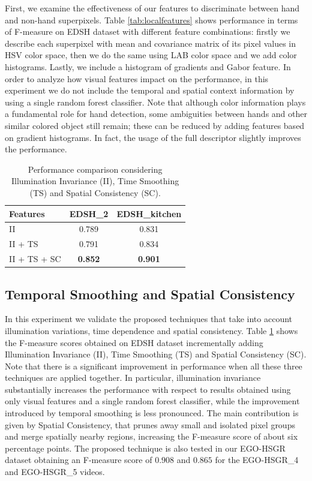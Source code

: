 First, we examine the effectiveness of our features to discriminate between hand and non-hand superpixels. 
Table \ref{tab:localfeatures} shows performance in terms of F-measure on EDSH dataset with different feature combinations: firstly we describe each superpixel with mean and covariance matrix of its pixel values in HSV color space, then we do the same using LAB color space and we add color histograms. Lastly, we include a histogram of gradients and Gabor feature.
In order to analyze how visual features impact on the performance, in this experiment we do not include the temporal and spatial context information by using a single random forest classifier.     
Note that although color information plays a fundamental role for hand detection, some ambiguities between hands and other similar colored object still remain; these can be reduced by adding features based on gradient histograms. In fact, the usage of the full descriptor slightly improves the performance.      

\begin{table}
 \centering
 \begin{tabular}{|l|c|c|}
 \hline
 \textbf{Features} 	& \textbf{EDSH\_2} & \textbf{EDSH\_{kitchen}}	\\ \hline\hline
 II	& 0.789 & 	0.831		\\ \hline
 II + TS	& 0.791	&	0.834 \\ \hline
 II + TS + SC &	\textbf{0.852} &	\textbf{0.901}	\\ \hline  
 \end{tabular}
 \caption{Performance comparison considering Illumination Invariance (II), Time Smoothing (TS) and Spatial Consistency (SC).}\label{tab:context}
\end{table}


\subsection{Temporal Smoothing and Spatial Consistency}
In this experiment we validate the proposed techniques that take into account illumination variations, time dependence and spatial consistency.
Table \ref{tab:context} shows the F-measure scores obtained on EDSH dataset incrementally adding Illumination Invariance (II), Time Smoothing (TS) and Spatial Consistency (SC). 
Note that there is a significant improvement in performance when all these three techniques are applied together.   
In particular, illumination invariance substantially increases the performance with respect to results obtained using only visual features and a single random forest classifier, while the improvement introduced by temporal smoothing is less pronounced. The main contribution is given by Spatial Consistency, that prunes away small and isolated pixel groups and merge spatially nearby regions, increasing the F-measure score of about six percentage points.
The proposed technique is also tested in our EGO-HSGR dataset obtaining an F-measure score of $0.908$ and $0.865$ for the EGO-HSGR\_{4} and EGO-HSGR\_{5} videos.        


